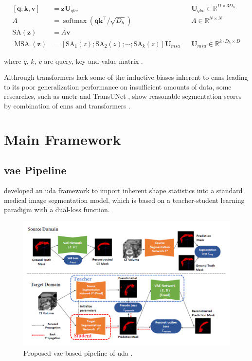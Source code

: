 \documentclass[11pt,times,oneside,openright]{eeereport}
\begin{document}
\begin{equation}
    \begin{array}{rlrl}
    {[\mathbf{q}, \mathbf{k}, \mathbf{v}]} & =\mathbf{z} \mathbf{U}_{q k v} && \mathbf{U}_{q k v} \in \mathbb{R}^{D \times 3 D_{h}} \\
    A & =\operatorname{softmax}\left(\mathbf{q k}^{\top} / \sqrt{D_{h}}\right) && A \in \mathbb{R}^{N \times N} \\
    \mathrm{SA}(\mathbf{z}) & =A \mathbf{v} \\
    \operatorname{MSA}(\mathbf{z}) &=\left[\mathrm{SA}_{1}(z) ; \mathrm{SA}_{2}(z) ; \cdots ; \mathrm{SA}_{k}(z)\right] \mathbf{U}_{m s a} &&\mathbf{U}_{m s a} \in \mathbb{R}^{k \cdot D_{h} \times D}
    \end{array}
\end{equation}

where $q$, $k$, $v$ are query, key and value matrix \cite{dosovitskiy2020image}.

Althrough transformers lack some of the inductive biases inherent to \acrshort{cnn}s leading to its poor generalization performance on insufficient amounts of data, some researches, such as \acrfull{unetr} \cite{hatamizadeh2022unetr} and TransUNet \cite{chen2021transunet}, show reasonable segmentation scores by combination of \acrshort{cnn}s and transformers \cite{dosovitskiy2020image}.


\section{Main Framework}

\subsection{\acrshort{vae} Pipeline}
\citet{yao2022unsupervised} developed an \acrfull{uda} framework to import inherent shape statistics into a standard medical image segmentation model, which is based on a teacher-student learning paradigm with a dual-loss function.

\begin{figure}[h]
    \centering
    \includegraphics[width=\textwidth]{fig/vae_seg.png}
    \caption{Proposed \acrshort{vae}-based pipeline of \acrlong{uda} \cite{yao2022unsupervised}.}
    \label{fig:vae_seg}
\end{figure}
\end{document}
